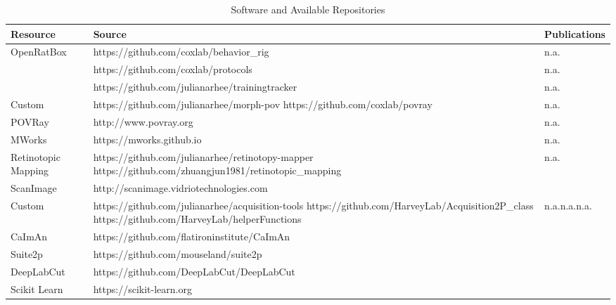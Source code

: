 \begin{table}[ht]
  \caption{Software and Available Repositories}
  \centering
  \footnotesize
  \begin{tabular}{ p{1.8cm}p{7.7cm}p{3.9cm}  }
    \toprule
    Resource & Source & Publications \\
    \midrule
    OpenRatBox  & https://github.com/coxlab/behavior\_rig & n.a. \\ 
                & https://github.com/coxlab/protocols & n.a. \\ 
                & https://github.com/julianarhee/trainingtracker & n.a. \\ 
    \midrule
    Custom  & https://github.com/julianarhee/morph-pov\newline 
             https://github.com/coxlab/povray & n.a.\newline \citet{Zoccolan2009} \\
    \addlinespace[0.05cm]
    POVRay  & http://www.povray.org & n.a. \\
    \addlinespace[0.05cm]
    MWorks  & https://mworks.github.io & n.a. \\
    \midrule
    Retinotopic Mapping & https://github.com/julianarhee/retinotopy-mapper\newline 
              https://github.com/zhuangjun1981/retinotopic\_mapping & n.a.\newline \citet{Zhuang2017} \\
    \midrule
    ScanImage   & http://scanimage.vidriotechnologies.com & \citet{Pologruto2003} \\ 
    \addlinespace[0.05cm]
    Custom & https://github.com/julianarhee/acquisition-tools\newline
                   https://github.com/HarveyLab/Acquisition2P\_class\newline
                   https://github.com/HarveyLab/helperFunctions & n.a.\newline n.a.\newline n.a.\\
    \midrule           
    CaImAn & https://github.com/flatironinstitute/CaImAn & \citet{Giovannucci2019}\newline \citet{Pnevmatikakis2019} \\
    \addlinespace[0.05cm]
    Suite2p & https://github.com/mouseland/suite2p & \citet{Pachitariu2017} \\
    \addlinespace[0.05cm]
    DeepLabCut   & https://github.com/DeepLabCut/DeepLabCut & \citet{Mathis2018}\newline \citet{Nath2019} \\
    \addlinespace[0.05cm]
    Scikit Learn   & https://scikit-learn.org & \citet{Pedregosa2011} \\
    \bottomrule
  \end{tabular}
  \label{tab:software}
\end{table}

